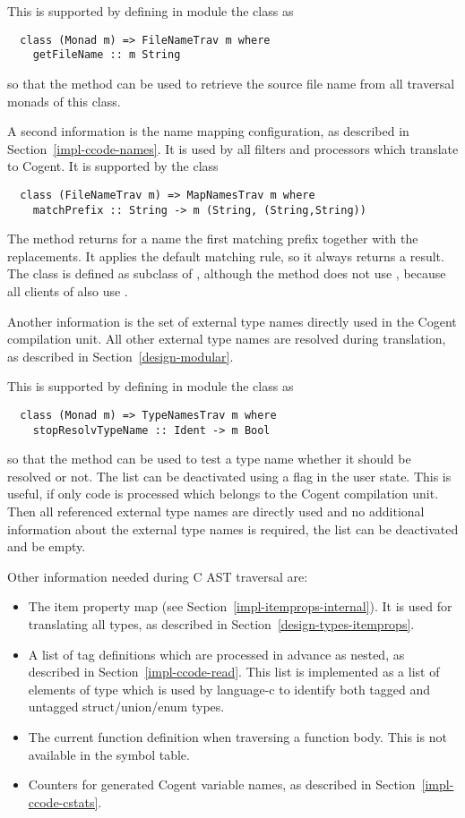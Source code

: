 This is supported by defining in module  the class  as
\begin{verbatim}
  class (Monad m) => FileNameTrav m where
    getFileName :: m String
\end{verbatim}
so that the method  can be used to retrieve the source file name from all traversal monads of 
this class. 

A second information is the name mapping configuration, as described in Section~\ref{impl-ccode-names}.
It is used by all filters and processors which translate to Cogent. It is supported by the class 
\begin{verbatim}
  class (FileNameTrav m) => MapNamesTrav m where
    matchPrefix :: String -> m (String, (String,String))
\end{verbatim}
The method  returns for a name the first matching prefix together with the replacements. It 
applies the default matching rule, so it always returns a result. The class is defined as subclass of 
, although the method does not use , because all clients of 
also use .

Another information is the set of external type names directly used in the Cogent compilation unit. All other 
external type names are resolved during translation, as described in Section~\ref{design-modular}.

This is supported by defining in module  the class  as
\begin{verbatim}
  class (Monad m) => TypeNamesTrav m where
    stopResolvTypeName :: Ident -> m Bool
\end{verbatim}
so that the method  can be used to test a type name whether it should be resolved or not.
The list can be deactivated using a flag in the user state. This is useful, if only code is processed which belongs
to the Cogent compilation unit. Then all referenced external type names are directly used and no additional information about
the external type names is required, the list can be deactivated and be empty.

Other information needed during C AST traversal are:
\begin{itemize}
\item The item property map (see Section~\ref{impl-itemprops-internal}).
It is used for translating all types, as described in Section~\ref{design-types-itemprops}.
\item A list of tag definitions which are processed in advance as nested, as described in 
Section~\ref{impl-ccode-read}. This list is implemented as a list of elements of type  which is used
by language-c to identify both tagged and untagged struct/union/enum types.
\item The current function definition when traversing a function body. This is not available in the symbol table.
\item Counters for generated Cogent variable names, as described in Section~\ref{impl-ccode-cstats}.
\end{itemize}

